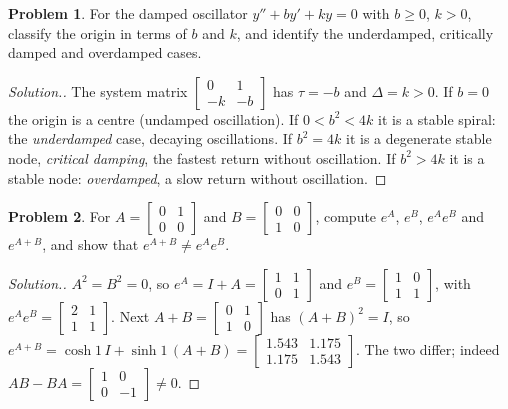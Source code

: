 \documentclass[11pt,a4paper]{article}
\numberwithin{equation}{section}
\theoremstyle{definition}
\newtheorem{problemx}{Problem}[subsection]
\newenvironment{problem}{\begin{problemx}}{\end{problemx}}
\newenvironment{solution}
  {\renewcommand{\qedsymbol}{}\begin{proof}[\textit{Solution}.]}
  {\end{proof}}
\begin{document}
\begin{problem}
For the damped oscillator $y'' + by' + ky = 0$ with $b \geq 0$, $k > 0$, classify the origin in terms of $b$ and $k$, and identify the underdamped, critically damped and overdamped
cases.
\end{problem}

\begin{solution}
The system matrix $\begin{bmatrix} 0 & 1\\ -k & -b\end{bmatrix}$ has $\tau = -b$ and $\Delta = k > 0$. If $b = 0$ the origin is a centre (undamped oscillation). If $0 < b^2 < 4k$ it is a stable spiral: the
\emph{underdamped} case, decaying oscillations. If $b^2 = 4k$ it is a degenerate stable node, \emph{critical damping}, the fastest return without oscillation. If $b^2 > 4k$ it is a stable node:
\emph{overdamped}, a slow return without oscillation.
\end{solution}

\begin{problem}
\label{prob:noncommute}
For $A = \begin{bmatrix} 0 & 1\\ 0 & 0\end{bmatrix}$ and $B = \begin{bmatrix} 0 & 0\\ 1 & 0\end{bmatrix}$, compute $e^A$, $e^B$, $e^Ae^B$ and $e^{A+B}$, and show that $e^{A+B} \neq e^Ae^B$.
\end{problem}

\begin{solution}
$A^2 = B^2 = 0$, so $e^A = I + A = \begin{bmatrix} 1 & 1\\ 0 & 1\end{bmatrix}$ and $e^B = \begin{bmatrix} 1 & 0\\ 1 & 1\end{bmatrix}$, with $e^Ae^B = \begin{bmatrix} 2 & 1\\ 1 & 1\end{bmatrix}$. Next $A + B = \begin{bmatrix} 0 & 1\\ 1 & 0\end{bmatrix}$ has $(A + B)^2 = I$, so
$e^{A+B} = \cosh1\,I + \sinh1\,(A + B) = \begin{bmatrix} 1.543 & 1.175\\ 1.175 & 1.543\end{bmatrix}$. The two differ; indeed $AB - BA = \begin{bmatrix} 1 & 0\\ 0 & -1\end{bmatrix} \neq 0$.
\end{solution}
\end{document}
